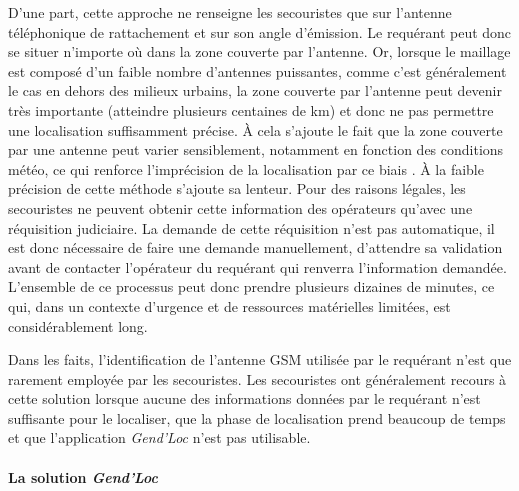 D'une part, cette approche ne renseigne les secouristes que sur
l'antenne téléphonique de rattachement et sur son angle d'émission. Le
requérant peut donc se situer n'importe où dans la zone couverte par
l'antenne. Or, lorsque le maillage est composé d'un faible nombre
d'antennes puissantes, comme c'est généralement le cas en dehors des
milieux urbains, la zone couverte par l'antenne peut devenir très
importante (\ie atteindre plusieurs centaines de km) et donc ne
pas permettre une localisation suffisamment précise. À cela s'ajoute
le fait que la zone couverte par une antenne peut varier sensiblement,
notamment en fonction des conditions météo, ce qui renforce
l'imprécision de la localisation par ce biais
\autocite{FenChong2012,OlteanuRaimond2012}. À la faible précision de
cette méthode s'ajoute sa lenteur. Pour des raisons légales, les
secouristes ne peuvent obtenir cette information des opérateurs
qu'avec une réquisition judiciaire. La demande de cette réquisition
n'est pas automatique, il est donc nécessaire de faire une demande
manuellement, d'attendre sa validation avant de contacter l'opérateur
du requérant qui renverra l'information demandée. L'ensemble de ce
processus peut donc prendre plusieurs dizaines de minutes, ce qui,
dans un contexte d'urgence et de ressources matérielles limitées, est
considérablement long.

Dans les faits, l'identification de l'antenne GSM utilisée par le
requérant n'est que rarement employée par les secouristes. Les
secouristes ont généralement recours à cette solution lorsque aucune
des informations données par le requérant n'est suffisante pour le
localiser, que la phase de localisation prend beaucoup de temps et que
l’application \emph{Gend'Loc} n'est pas utilisable.

\paragraph{La solution \emph{Gend'Loc}}

